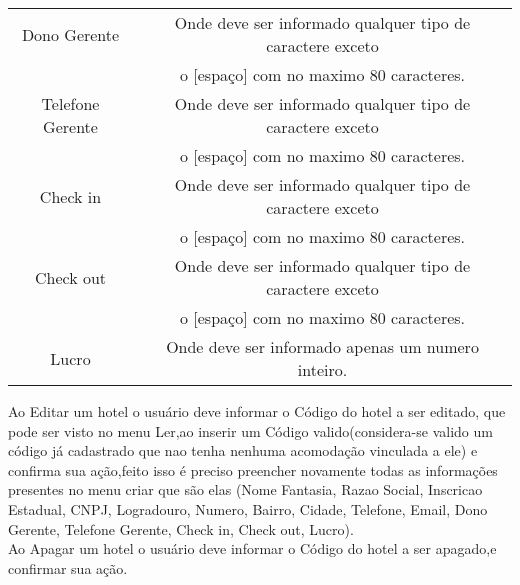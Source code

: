 \documentclass[titlepage]{article}
\begin{document}
\begin{table}[h]
\begin{tabular}{|c|c|}
						Dono Gerente & Onde deve ser informado qualquer tipo de caractere exceto \\ & o [espaço] com no maximo 80 caracteres.\\
						\hline
						Telefone Gerente & Onde deve ser informado qualquer tipo de caractere exceto \\ & o [espaço] com no maximo 80 caracteres.\\
						\hline
						Check in & Onde deve ser informado qualquer tipo de caractere exceto \\ & o [espaço] com no maximo 80 caracteres.\\
						\hline
						Check out & Onde deve ser informado qualquer tipo de caractere exceto \\ & o [espaço] com no maximo 80 caracteres.\\
						\hline
						Lucro & Onde deve ser informado apenas um numero inteiro.\\
						\hline
					\end{tabular}
				\end{table}

			

				Ao Editar um hotel o usuário deve informar o Código do hotel a ser editado, que pode ser visto no menu Ler,ao inserir um Código valido(considera-se valido um código já cadastrado que nao tenha nenhuma acomodação vinculada a ele) e confirma sua ação,feito isso é preciso preencher novamente todas as informações presentes no menu criar que são elas (Nome Fantasia, Razao Social, Inscricao Estadual, CNPJ, 	Logradouro, Numero, Bairro, Cidade, 	Telefone, 	Email, 	Dono Gerente, 	Telefone Gerente, 	Check in, 	Check out, 	Lucro).\\

				Ao Apagar um hotel o usuário deve informar o Código do hotel a ser apagado,e confirmar sua ação. \\


				\newpage
\end{document}
